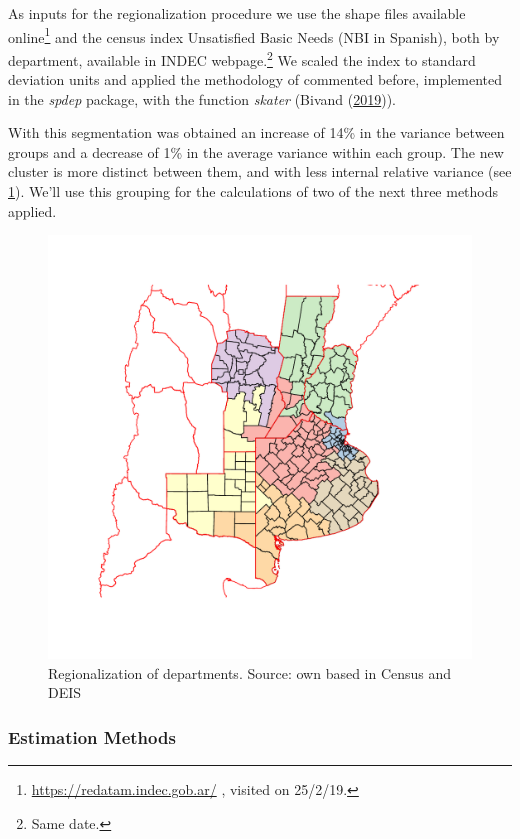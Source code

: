 \documentclass[12pt,]{article}
\begin{document}
As inputs for the regionalization procedure we use the shape files
available online\footnote{\url{https://redatam.indec.gob.ar/} , visited
  on 25/2/19.} and the census index Unsatisfied Basic Needs (NBI in
Spanish), both by department, available in INDEC webpage.\footnote{Same
  date.} We scaled the index to standard deviation units and applied the
methodology of commented before, implemented in the \emph{spdep}
package, with the function \emph{skater} (Bivand
(\protect\hyperlink{ref-Bivand2019}{2019})).

With this segmentation was obtained an increase of 14\% in the variance
between groups and a decrease of 1\% in the average variance within each
group. The new cluster is more distinct between them, and with less
internal relative variance (see \ref{fig:cluster}). We'll use this
grouping for the calculations of two of the next three methods applied.

\begin{figure}

{\centering \includegraphics[width=0.7\linewidth]{plots/cluster} 

}

\caption{Regionalization of departments. Source: own based in Census and DEIS}\label{fig:cluster}
\end{figure}

\hypertarget{estimation-methods}{%
\subsubsection{\texorpdfstring{\textbf{Estimation
Methods}}{Estimation Methods}}\label{estimation-methods}}
\end{document}
